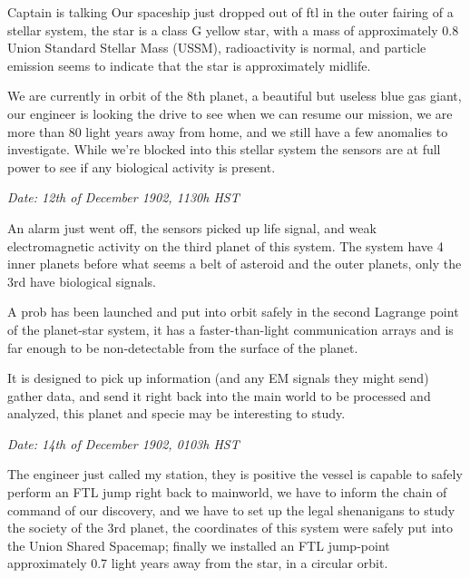 \documentclass[hidelinks,12pt,a4paper]{book}
\begin{document}
Captain is talking\newline
Our spaceship just dropped out of \gls{ftl} in the outer fairing of a stellar system, 
the star is a class G yellow star, with a mass of approximately 0.8 Union Standard Stellar Mass (USSM), 
radioactivity is normal, and particle emission seems to indicate that the star is approximately midlife.\par
\bigskip
We are currently in orbit of the 8th planet, 
a beautiful but useless blue gas giant, 
our engineer is looking the drive to see when we can resume our mission, 
we are more than 80 light years away from home, and we still have a few anomalies to investigate. 
While we're blocked into this stellar system the sensors are at full power to see if any biological activity is present.\newline

\textit{Date: 12th of December 1902, 1130h HST}\par

An alarm just went off, 
the sensors picked up life signal, and weak electromagnetic activity on the third planet of this system. 
The system have 4 inner planets before what seems a belt of asteroid and the outer planets, 
only the 3rd have biological signals. \par
\bigskip

A prob has been launched and put into orbit safely in the second Lagrange point of the planet-star system,
 it has a faster-than-light communication arrays and is far enough to be non-detectable from the surface of the planet. \par
\bigskip
It is designed to pick up information 
(and any EM signals they might send) gather data, and send it right back into the main world to be processed and analyzed, 
this planet and specie may be interesting to study.\par
\bigskip

\textit{Date: 14th of December 1902, 0103h HST}\par

The engineer just called my station, 
they is positive the vessel is capable to safely perform an FTL jump right back to mainworld, 
we have to inform the chain of command of our discovery, and we have to set up the legal shenanigans 
to study the society of the 3rd planet, the coordinates of this system were safely put into the Union Shared Spacemap;
finally we installed an FTL jump-point approximately 0.7 light years away from the star, in a circular orbit.\par
\bigskip
\end{document}
